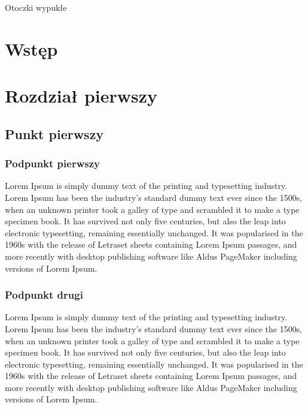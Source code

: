 \newcommand*{\includesDirectory}{includes}
\newcommand*{\settingsDirectory}{\includesDirectory/settings}







    \thispagestyle{empty}
    \begin{center}
        \Huge{Otoczki wypukłe}
    \end{center}
    \tableofcontents

    \newcommand\intro{Wstęp}
    
    \chapter*{\intro}  
    \addcontentsline{toc}{chapter}{\intro}      

    \chapter{Rozdział pierwszy}
        \section{Punkt pierwszy}
            \subsection{Podpunkt pierwszy}
                Lorem Ipsum is simply dummy text of the printing and typesetting industry. Lorem Ipsum has been the industry's standard dummy text ever since the 1500s, when an unknown printer took a galley of type and scrambled it to make a type specimen book. It has survived not only five centuries, but also the leap into electronic typesetting, remaining essentially unchanged. It was popularised in the 1960s with the release of Letraset sheets containing Lorem Ipsum passages, and more recently with desktop publishing software like Aldus PageMaker including versions of Lorem Ipsum.
            \subsection{Podpunkt drugi}
                Lorem Ipsum is simply dummy text of the printing and typesetting industry. Lorem Ipsum has been the industry's standard dummy text ever since the 1500s, when an unknown printer took a galley of type and scrambled it to make a type specimen book. It has survived not only five centuries, but also the leap into electronic typesetting, remaining essentially unchanged. It was popularised in the 1960s with the release of Letraset sheets containing Lorem Ipsum passages, and more recently with desktop publishing software like Aldus PageMaker including versions of Lorem Ipsum.
